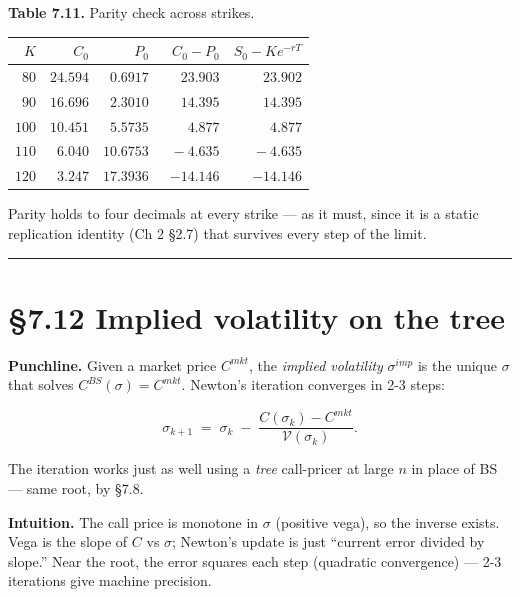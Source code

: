 \documentclass[
  10pt,
  twoside]{book}
\newcounter{none} %
\begin{document}
\textbf{Table 7.11.} Parity check across strikes.

{\def\LTcaptype{none} %
\begin{table}[H]
\centering
\begin{tabular}{|r|r|r|r|r|}
\toprule
\(K\) & \(C_0\) & \(P_0\) & \(C_0 - P_0\) & \(S_0 - Ke^{-rT}\) \\
\midrule



\(\phantom{0}80\) & \(24.594\) & \(\phantom{0}0.6917\) &
\(\phantom{-0}23.903\) & \(\phantom{-0}23.902\) \\
\(\phantom{0}90\) & \(16.696\) & \(\phantom{0}2.3010\) &
\(\phantom{-0}14.395\) & \(\phantom{-0}14.395\) \\
\(100\) & \(10.451\) & \(\phantom{0}5.5735\) & \(\phantom{-00}4.877\) &
\(\phantom{-00}4.877\) \\
\(110\) & \(\phantom{0}6.040\) & \(10.6753\) & \(\phantom{0}-4.635\) &
\(\phantom{0}-4.635\) \\
\(120\) & \(\phantom{0}3.247\) & \(17.3936\) & \(-14.146\) &
\(-14.146\) \\
\bottomrule
\end{tabular}
\end{table}
}

Parity holds to four decimals at every strike --- as it must, since it
is a static replication identity (Ch 2 §2.7) that survives every step of
the limit.

\begin{center}\rule{0.5\linewidth}{0.5pt}\end{center}

\section{§7.12 Implied volatility on the
tree}\label{implied-volatility-on-the-tree}

\textbf{Punchline.} Given a market price \(C^{mkt}\), the \emph{implied
volatility} \(\sigma^{imp}\) is the unique \(\sigma\) that solves
\(C^{BS}(\sigma) = C^{mkt}\). Newton's iteration converges in 2-3 steps:

\[\sigma_{k+1} \;=\; \sigma_k \;-\; \frac{C(\sigma_k) - C^{mkt}}{\mathcal V(\sigma_k)}.\]

The iteration works just as well using a \emph{tree} call-pricer at
large \(n\) in place of BS --- same root, by §7.8.

\textbf{Intuition.} The call price is monotone in \(\sigma\) (positive
vega), so the inverse exists. Vega is the slope of \(C\) vs \(\sigma\);
Newton's update is just ``current error divided by slope.'' Near the
root, the error squares each step (quadratic convergence) --- 2-3
iterations give machine precision.
\end{document}
